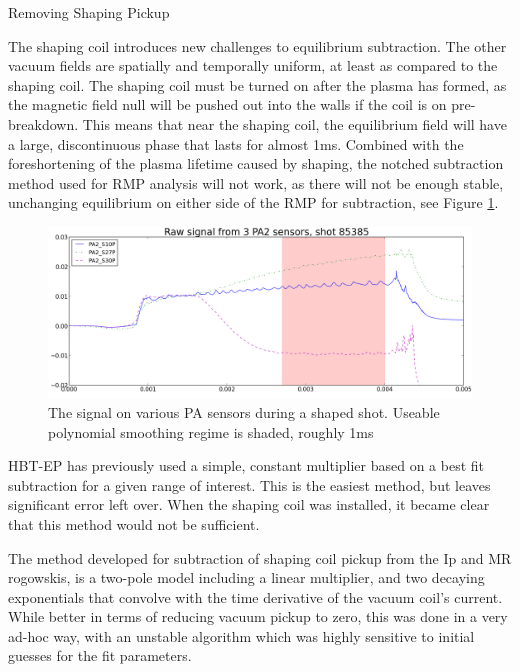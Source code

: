 \documentclass{article}
\begin{document}
\vspace{0.25in}
\begin{center}
\begin{LARGE}
Removing Shaping Pickup
\end{LARGE}
\end{center}
\par
The shaping coil introduces new challenges to equilibrium subtraction.  The other vacuum fields are spatially and temporally uniform, at least as compared to the shaping coil.  The shaping coil must be turned on after the plasma has formed, as the magnetic field null will be pushed out into the walls if the coil is on pre-breakdown.  This means that near the shaping coil, the equilibrium field will have a large, discontinuous phase that lasts for almost 1ms.  Combined with the foreshortening of the plasma lifetime caused by shaping, the notched subtraction method used for RMP analysis will not work, as there will not be enough stable, unchanging equilibrium on either side of the RMP for subtraction, see Figure \ref{PA_shaping}.\par
\begin{figure}[htb]
\includegraphics[width = \textwidth]{./shaping_raw_sig.png}\caption{The signal on various PA sensors during a shaped shot.  Useable polynomial smoothing regime is shaded, roughly 1ms}
\label{PA_shaping}
\end{figure}
HBT-EP has previously used a simple, constant multiplier based on a best fit subtraction for a given range of interest.  This is the easiest method, but leaves significant error left over.  When the shaping coil was installed, it became clear that this method would not be sufficient.\par
The method developed for subtraction of shaping coil pickup from the Ip and MR rogowskis, is a two-pole model including a linear multiplier, and two decaying exponentials that convolve with the time derivative of the vacuum coil's current.  While better in terms of reducing vacuum pickup to zero, this was done in a very ad-hoc way, with an unstable algorithm which was highly sensitive to initial guesses for the fit parameters.\par 
\end{document}
